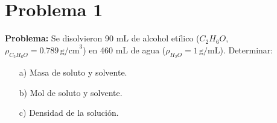 \documentclass{article}
\begin{document}
\newpage
\section*{Problema 1}









\textbf{Problema:}  
Se disolvieron 90 mL de alcohol etílico (\(C_2H_6O\), \(\rho_{C_2H_6O} = 0.789 \, \text{g/cm}^3\)) en 460 mL de agua (\(\rho_{H_2O} = 1 \, \text{g/mL}\)). Determinar:

\begin{itemize}
    \item[a)] Masa de soluto y solvente.
    \item[b)] Mol de soluto y solvente.
    \item[c)] Densidad de la solución.
\end{itemize}
\end{document}
